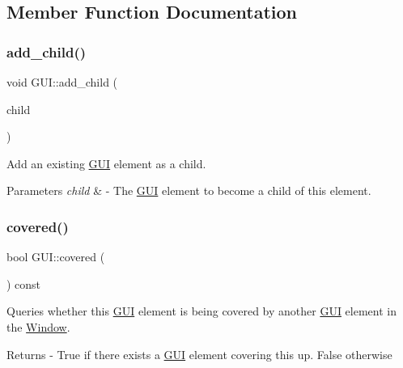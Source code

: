 \subsection{Member Function Documentation}
\mbox{\label{class_g_u_i_a05ceaea0a9ae997ad62f5115b32dd287}} 
\subsubsection{\texorpdfstring{add\+\_\+child()}{add\_child()}}
{\footnotesize\ttfamily void G\+U\+I\+::add\+\_\+child (\begin{DoxyParamCaption}\item[{\mbox{\hyperlink{class_g_u_i}{G\+UI}} $\ast$}]{child }\end{DoxyParamCaption})}

Add an existing \mbox{\hyperlink{class_g_u_i}{G\+UI}} element as a child. 
\begin{DoxyParams}{Parameters}
{\em child} & -\/ The \mbox{\hyperlink{class_g_u_i}{G\+UI}} element to become a child of this element. \\
\hline
\end{DoxyParams}
\mbox{\label{class_g_u_i_a824033514dfb2c193a5c22370a3b8fb1}} 
\subsubsection{\texorpdfstring{covered()}{covered()}}
{\footnotesize\ttfamily bool G\+U\+I\+::covered (\begin{DoxyParamCaption}{ }\end{DoxyParamCaption}) const}

Queries whether this \mbox{\hyperlink{class_g_u_i}{G\+UI}} element is being covered by another \mbox{\hyperlink{class_g_u_i}{G\+UI}} element in the \mbox{\hyperlink{class_window}{Window}}. \begin{DoxyReturn}{Returns}
-\/ True if there exists a \mbox{\hyperlink{class_g_u_i}{G\+UI}} element covering this up. False otherwise 
\end{DoxyReturn}
\mbox{\label{class_g_u_i_a9f8f70693f5ea986fbbdfe0686f6b30d}} 
